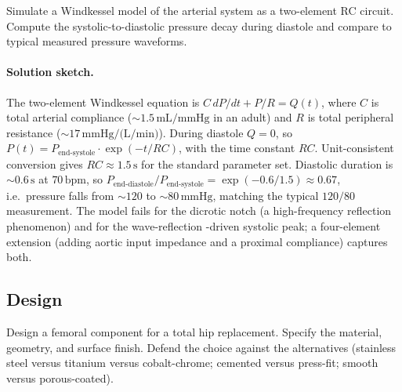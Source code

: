 \begin{exercise}
Simulate a Windkessel model of the arterial system as a two-element
RC circuit. Compute the systolic-to-diastolic pressure decay during
diastole and compare to typical measured pressure waveforms.
\end{exercise}

\paragraph{Solution sketch.}
The two-element Windkessel equation is
$C\,dP/dt + P/R = Q(t)$, where $C$ is total arterial compliance
($\sim 1.5\,\text{mL/mmHg}$ in an adult) and $R$ is total peripheral
resistance ($\sim 17\,\text{mmHg/(L/min)}$). During diastole $Q = 0$,
so $P(t) = P_{\text{end-systole}} \cdot \exp(-t/RC)$, with the
time constant $RC$. Unit-consistent conversion gives
$RC \approx 1.5\,\text{s}$ for the standard parameter set.
Diastolic duration is $\sim 0.6\,\text{s}$ at $70\,\text{bpm}$, so
$P_{\text{end-diastole}}/P_{\text{end-systole}}
= \exp(-0.6/1.5) \approx 0.67$, i.e.\ pressure falls from
$\sim 120$ to $\sim 80\,\text{mmHg}$, matching the typical $120/80$
measurement. The model fails for the dicrotic notch (a
high-frequency reflection phenomenon) and for the wave-reflection
-driven systolic peak; a four-element extension (adding aortic input
impedance and a proximal compliance) captures both.

\subsection*{Design}

\begin{exercise}
Design a femoral component for a total hip replacement. Specify the
material, geometry, and surface finish. Defend the choice against
the alternatives (stainless steel versus titanium versus cobalt-chrome;
cemented versus press-fit; smooth versus porous-coated).
\end{exercise}

